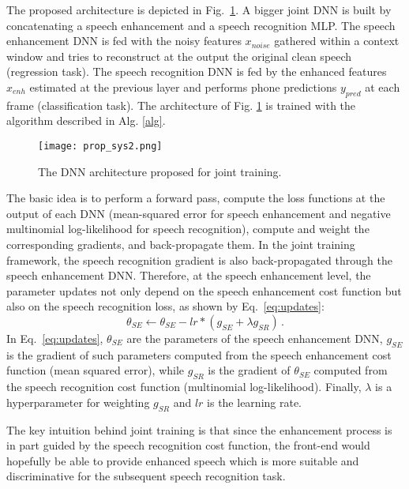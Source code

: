 \documentclass{article}
\begin{document}
The proposed architecture is depicted in Fig.~\ref{fig:arch}. A bigger joint DNN is built by concatenating a speech enhancement and a speech recognition MLP. The speech enhancement DNN is fed with the noisy features $x_{noise}$ gathered within a context window and tries to reconstruct at the output the original clean speech (regression task). 
The speech recognition DNN is fed by the enhanced features $x_{enh}$ estimated at the previous layer and performs phone predictions $y_{pred}$ at each frame (classification task). The architecture of Fig. \ref{fig:arch} is trained with the algorithm described in Alg. \ref{alg}.

\label{sec:format}
\begin{figure}[t!]
\centering
\texttt{[image: prop\_sys2.png]}
\caption{The DNN architecture proposed for joint training.}
\label{fig:arch}
\end{figure}
The basic idea is to perform a forward pass, compute the loss functions at the output of each DNN (mean-squared error for speech enhancement and negative multinomial  log-likelihood for speech recognition), compute and weight the corresponding gradients, and back-propagate them.
In the joint training framework, the speech recognition gradient is also back-propagated through the speech enhancement DNN. Therefore, at the speech enhancement level, the parameter updates not only depend on the speech enhancement cost function but also on the speech recognition loss, as shown by Eq.~\ref{eq:updates}:
 \begin{equation}
 \theta_{SE} \gets \theta_{SE}- lr * (g_{SE}+\lambda g_{SR}) \,.
 \label{eq:updates}
 \end{equation}
In Eq.~\ref{eq:updates}, $\theta_{SE}$ are the parameters of the speech enhancement DNN, $g_{SE}$ is the gradient of such parameters computed from the speech enhancement cost function (mean squared error), while $g_{SR}$ is the gradient of $\theta_{SE}$ computed from the speech recognition cost function (multinomial log-likelihood). Finally, $\lambda$ is a hyperparameter for weighting $g_{SR}$ and $lr$ is the learning rate.

The key intuition behind joint training is that since the enhancement process is in part guided by the speech recognition cost function, the front-end would hopefully be  able to provide enhanced speech which is more suitable and discriminative for the subsequent speech recognition task. %
\end{document}

